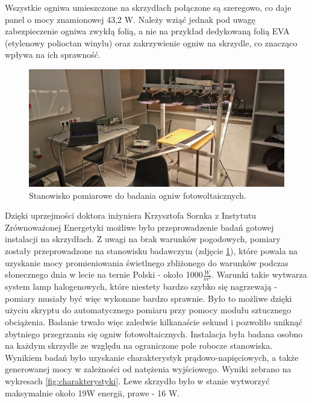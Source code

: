 \documentclass[12pt, a4paper]{article}
\begin{document}
Wszystkie ogniwa umieszczone na skrzydłach połączone są szeregowo, co daje panel o mocy znamionowej 43,2 W. Należy wziąć jednak pod uwagę zabezpieczenie ogniwa zwykłą folią, a nie na przykład dedykowaną folią EVA (etylenowy polioctan winylu) oraz zakrzywienie ogniw na skrzydle, co znacząco wpływa na ich sprawność.

\begin{figure}[ht]
    \centering
    \includegraphics[width=1\textwidth]{badania}
    \caption{Stanowisko pomiarowe do badania ogniw fotowoltaicznych.}
    \label{fig:badanie}
\end{figure}

Dzięki uprzejmości doktora inżyniera Krzysztofa Sornka z Instytutu Zrównoważonej Energetyki możliwe było przeprowadzenie badań gotowej instalacji na skrzydłach. Z uwagi na brak warunków pogodowych, pomiary zostały przeprowadzone na stanowisku badawczym (zdjęcie \ref{fig:badanie}), które powala na uzyskanie mocy promieniowania świetlnego zbliżonego do warunków podczas słonecznego dnia w lecie na ternie Polski - około 1000$\frac{W}{m^2}$. Warunki takie wytwarza system lamp halogenowych, które niestety bardzo szybko się nagrzewają - pomiary musiały być więc wykonane bardzo sprawnie. Było to możliwe dzięki użyciu skryptu do automatycznego pomiaru przy pomocy modułu sztucznego obciążenia. Badanie trwało więc zaledwie kilkanaście sekund i pozwoliło uniknąć zbytniego przegrzania się ogniw fotowoltaicznych. Instalacja była badana osobno na każdym skrzydle ze względu na ograniczone pole robocze stanowiska. Wynikiem badań było uzyskanie charakterystyk prądowo-napięciowych, a także generowanej mocy w zależności od natężenia wyjściowego. Wyniki zebrano na wykresach \ref{fig:charakterystyki}. Lewe skrzydło było w stanie wytworzyć maksymalnie około 19W energii, prawe - 16 W.
\end{document}
